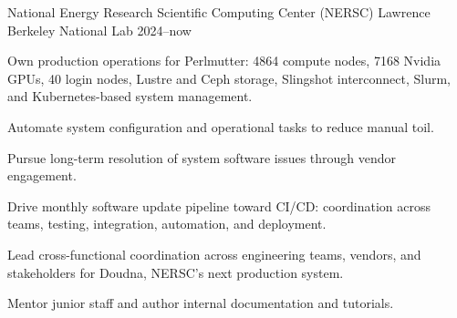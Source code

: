 

  \cventryflow
  {
  } %
  {National Energy Research Scientific Computing Center (NERSC)}  %
  {Lawrence Berkeley National Lab}  %
  {2024--now}  %
  {
    \begin{cvitems}
    \item Own production operations for Perlmutter: 4864 compute nodes, 7168 Nvidia GPUs, 40 login nodes, Lustre and Ceph storage, Slingshot interconnect, Slurm, and Kubernetes-based system management.
    \item Automate system configuration and operational tasks to reduce manual toil.
    \item Pursue long-term resolution of system software issues through vendor engagement.
    \item Drive monthly software update pipeline toward CI/CD:
      coordination across teams, testing, integration, automation, and deployment.
    \item Lead cross-functional coordination across engineering teams, vendors, and stakeholders for Doudna, NERSC's next production system.
    \item Mentor junior staff and author internal documentation and tutorials.
    \end{cvitems}
  }

